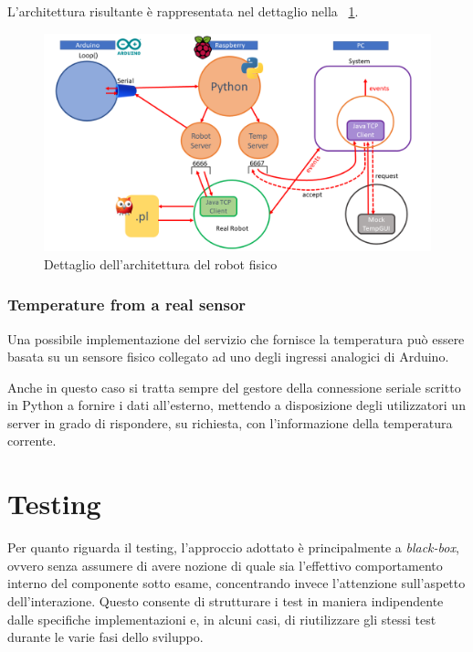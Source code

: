 \documentclass{../llncs}
\newcommand{\labelsec}[1]{\label{sec:#1}}
\newcommand{\labelfig}[1]{\label{fig:#1}}
\newcommand{\xf}[1]{\figurename~\ref{fig:#1}}
\begin{document}
L'architettura risultante è rappresentata nel dettaglio nella \xf{raspInteractions}.

\begin{figure}[!htb]
\centering
\includegraphics[scale=0.40]{img/raspberryInteraction.png}
\caption{Dettaglio dell'architettura del robot fisico}\labelfig{raspInteractions}
\end{figure}

\subsubsection{Temperature from a real sensor}
Una possibile implementazione del servizio che fornisce la temperatura può essere basata su un sensore fisico collegato ad uno degli ingressi analogici di Arduino.

Anche in questo caso si tratta sempre del gestore della connessione seriale scritto in Python a fornire i dati all'esterno, mettendo a disposizione degli utilizzatori un server in grado di rispondere, su richiesta, con l'informazione della temperatura corrente.


\section{Testing}
\labelsec{Testing}

Per quanto riguarda il testing, l'approccio adottato è principalmente a \emph{black-box}, ovvero senza assumere di avere nozione di quale sia l'effettivo comportamento interno del componente sotto esame, concentrando invece l'attenzione sull'aspetto dell'interazione. Questo consente di strutturare i test in maniera indipendente dalle specifiche implementazioni e, in alcuni casi, di riutilizzare gli stessi test durante le varie fasi dello sviluppo.\\
\end{document}

